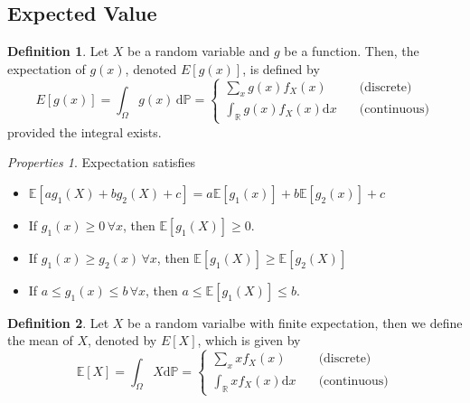 \documentclass[twoside]{article}
\theoremstyle{definition}
\newtheorem{definition}{Definition}[section]
\theoremstyle{remark}
\newtheorem{properties}[theorem]{Properties}
\theoremstyle{remark}
\begin{document}
\subsection{Expected Value}
\begin{definition}
  Let $X$ be a random variable and $g$ be a function. Then, the expectation of
  $g(x)$, denoted $E[g(x)]$, is defined by
  \begin{equation}
    E[g(x)] = \int_{\Omega} g(x)\, \mathrm{d}\mathbb{P} =
    \left\{
    \begin{array}{ll}
      \sum_{x} g(x) f_X(x)                      & \quad \textrm{(discrete)} \\
      \int_{\mathbb{R}} g(x) f_X(x) \mathrm{d}x & \quad \textrm{(continuous)}
    \end{array}
    \right.
  \end{equation}
  provided the integral exists.
\end{definition}

\begin{properties}{Expectation satisfies}
  \begin{itemize}
    \item $\mathbb{E}[a g_1(X) + b g_2(X) + c] = a\mathbb{E}[g_1(x)] + b\mathbb{E}[g_2(x)] + c$
    \item If $g_1(x) \geq 0 \, \forall x$, then $\mathbb{E}[g_1(X)] \geq 0$.
    \item If $g_1(x) \geq g_2(x) \, \forall x$, then $\mathbb{E}[g_1(X)] \geq \mathbb{E}[g_2(X)]$
    \item If $a \leq g_1(x) \leq b \, \forall x$, then $a \leq \mathbb{E}[g_1(X)] \leq b$.
  \end{itemize}
\end{properties}

\begin{definition}
  Let $X$ be a random varialbe with finite expectation, then we define the mean
  of $X$, denoted by $E[X]$, which is given by
  \begin{equation}
  \mathbb{E}[X] = \int_\Omega X \mathrm{d}\mathbb{P} =
  \left\{
  \begin{array}{ll}
    \sum_{x} x f_X(x)                      & \quad \textrm{(discrete)} \\
    \int_{\mathbb{R}} x f_X(x) \mathrm{d}x & \quad \textrm{(continuous)}
  \end{array}
  \right.
  \end{equation}
\end{definition}
\end{document}
